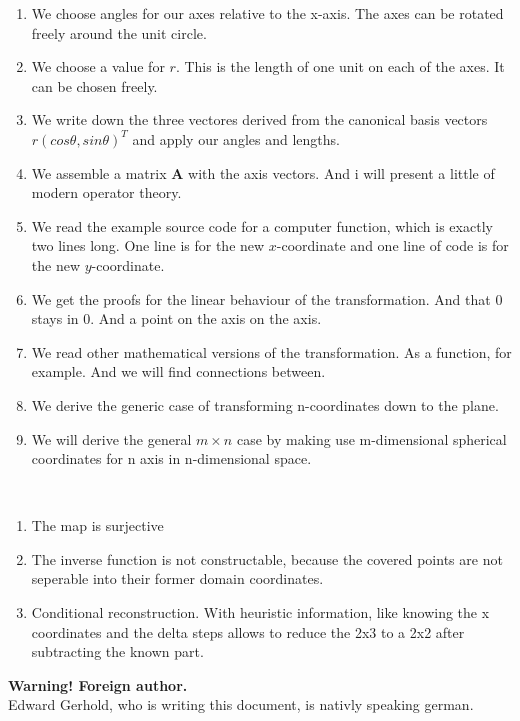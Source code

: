 \documentclass[a4paper]{article}
\begin{document}
\begin{enumerate}
\item We choose angles for our axes relative to the x-axis. The axes can be rotated freely around the unit circle.
\item We choose a value for $r$. This is the length of one unit on each of the axes. It can be chosen freely.
\item We write down the three vectores derived from the canonical basis vectors $r(cos \theta, sin \theta)^{T}$ and apply our angles and lengths.
\item We assemble a matrix $\boldsymbol{A}$ with the axis vectors. And i will present a little of modern operator theory.
\item We read the example source code for a computer function, which is exactly two lines long. One line is for the new $x$-coordinate and one line of code is for the new $y$-coordinate.
\item We get the proofs for the linear behaviour of the transformation. And that 0 stays in 0. And a point on the axis on the axis.
\item We read other mathematical versions of the transformation. As a function, for example. And we will find connections between.
\item We derive the generic case of transforming n-coordinates down to the plane. 
\item We will derive the general $m\times n$ case by making use m-dimensional spherical coordinates for n axis in n-dimensional space.
\end{enumerate}\\



\begin{enumerate}
	\item The map is surjective
	\item The inverse function is not constructable, because the covered points are not seperable into their former domain coordinates. 
	\item Conditional reconstruction. With heuristic information, like knowing the x coordinates and the delta steps allows to reduce the 2x3 to a 2x2 after subtracting the known part.
\end{enumerate}

\textbf{Warning! Foreign author.}\\

Edward Gerhold, who is writing this document, is nativly speaking german. 
\end{document}
